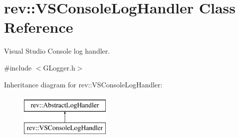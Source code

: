 \hypertarget{classrev_1_1_v_s_console_log_handler}{}\section{rev\+::V\+S\+Console\+Log\+Handler Class Reference}
\label{classrev_1_1_v_s_console_log_handler}


Visual Studio Console log handler.  




{\ttfamily \#include $<$G\+Logger.\+h$>$}

Inheritance diagram for rev\+::V\+S\+Console\+Log\+Handler\+:\begin{figure}[H]
\begin{center}
\leavevmode
\includegraphics[height=2.000000cm]{classrev_1_1_v_s_console_log_handler}
\end{center}
\end{figure}
